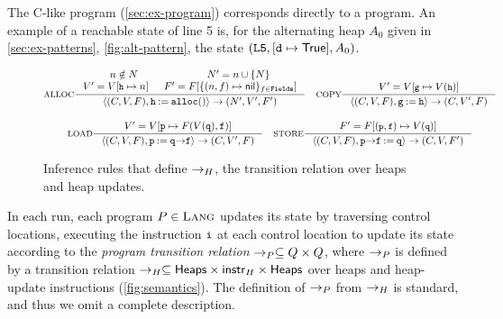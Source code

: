 \begin{ex}
  \label{ex:lang-state}
  The C-like program \altlist (\autoref{sec:ex-program}) corresponds
  directly to a \lang program.
  An example of a reachable state of \altlist line 5 is, for the
  alternating heap $A_0$ given in \autoref{sec:ex-patterns},
  \autoref{fig:alt-pattern}, the state $(\texttt{L5}, [\texttt{d}
  \mapsto \mathsf{True}], A_0)$.
\end{ex}

\begin{figure*}
  \centering
  \begin{gather*}
    \inference[ALLOC]
    { n \notin N & N' = \add{n}{N} \\
      V' = \upd{V}{\cc{h}}{n}
      & F' = F[ \{ (n, f) \mapsto \nil \}_{f \in \fields} ]
    }
    { \langle (C, V, F), \code{h \assign \alloc()} \rangle \step
      (N', V', F')
    } \rulebuffer
    \inference[COPY]
    {  V' = \upd{V}{\cc{g}}{V(\cc{h})}
    }
    { \langle (C, V, F), \code{g \assign h} \rangle \step
      (C, V', F)
    } \\[\rowspace]
    \inference[LOAD]
    { V' = \upd{V}{\code{p}}{F(V(\code{q}), \code{f})}
    }
    { \langle (C, V, F), \code{p \assign q \select f} \rangle \step
      (C, V', F)
    } \rulebuffer
    \inference[STORE]
    { F' = \upd{F}{(\cc{p}, \cc{f})}{V(\cc{q})}
    }
    { \langle (C, V, F), \code{p \select f \assign q } \rangle
      \step
      (C, V, F')
    }
  \end{gather*}
  \caption{Inference rules that define $\rightarrow_H$, the transition
    relation over heaps and heap updates.}
  \label{fig:semantics}
\end{figure*}

In each run, each program $P \in \textsc{Lang}$ updates its state by
traversing control locations, executing the instruction $\cc{i}$ at
each control location to update its state according to the
\emph{program transition relation} $\rightarrow_{P} \subseteq Q
\times Q$, where $\rightarrow_{P}$ is defined by a transition
relation $\rightarrow_H \subseteq \mathsf{Heaps} \times \mathsf{instr}_H \times \mathsf{Heaps}$
over heaps and heap-update instructions (\autoref{fig:semantics}).
%
The definition of $\rightarrow_{P}$ from $\rightarrow_H$ is standard, and
thus we omit a complete description.

